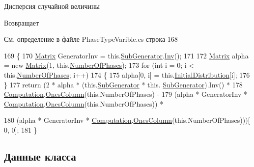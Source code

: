 Дисперсия случайной величины 

\begin{DoxyReturn}{Возвращает}

\end{DoxyReturn}


См. определение в файле Phase\+Type\+Varible.\+cs строка 168


\begin{DoxyCode}
169         \{
170             \hyperlink{class_b_l_a_s_1_1_matrix}{Matrix} GeneratorInv = this.\hyperlink{class_phase_type_distribution_1_1_phase_type_varible_a9832e75be88711d5939e808aea3b4121}{SubGenerator}.\hyperlink{class_b_l_a_s_1_1_matrix_aa6af90c35062376d6e0db316fd2cad70}{Inv}(); 
171 
172             \hyperlink{class_b_l_a_s_1_1_matrix}{Matrix} alpha = \textcolor{keyword}{new} \hyperlink{class_b_l_a_s_1_1_matrix}{Matrix}(1, this.\hyperlink{class_phase_type_distribution_1_1_phase_type_varible_a1bfaf7709c227b28fbbc89b808a89bfe}{NumberOfPhases});
173             \textcolor{keywordflow}{for} (\textcolor{keywordtype}{int} i = 0; i < this.\hyperlink{class_phase_type_distribution_1_1_phase_type_varible_a1bfaf7709c227b28fbbc89b808a89bfe}{NumberOfPhases}; i++)
174             \{
175                 alpha[0, i] = this.\hyperlink{class_phase_type_distribution_1_1_phase_type_varible_ac9102d397b010f61b97cda69acfdb31b}{InitialDistribution}[i];
176             \}
177             \textcolor{keywordflow}{return} (2 * alpha * (this.\hyperlink{class_phase_type_distribution_1_1_phase_type_varible_a9832e75be88711d5939e808aea3b4121}{SubGenerator} * this.
      \hyperlink{class_phase_type_distribution_1_1_phase_type_varible_a9832e75be88711d5939e808aea3b4121}{SubGenerator}).Inv() * 
178                 \hyperlink{class_b_l_a_s_1_1_computation}{Computation}.\hyperlink{class_b_l_a_s_1_1_computation_ae7bf65dbabdb3c801ccddba5ed866b11}{OnesColumn}(\textcolor{keyword}{this}.NumberOfPhases) -
179                 (alpha * GeneratorInv * \hyperlink{class_b_l_a_s_1_1_computation}{Computation}.\hyperlink{class_b_l_a_s_1_1_computation_ae7bf65dbabdb3c801ccddba5ed866b11}{OnesColumn}(this.NumberOfPhases)) *
       
180                 (alpha * GeneratorInv * \hyperlink{class_b_l_a_s_1_1_computation}{Computation}.\hyperlink{class_b_l_a_s_1_1_computation_ae7bf65dbabdb3c801ccddba5ed866b11}{OnesColumn}(\textcolor{keyword}{this}.NumberOfPhases)))[
      0, 0];
181         \}
\end{DoxyCode}


\subsection{Данные класса}
